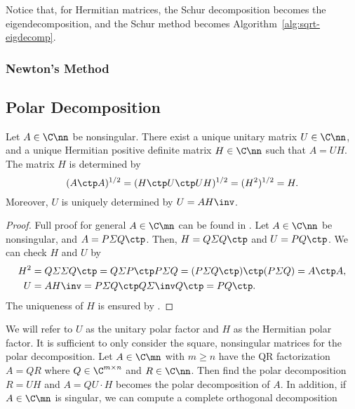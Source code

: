 Notice that, for Hermitian matrices, the Schur decomposition becomes the
eigendecomposition, and the Schur method becomes
Algorithm~\ref{alg:sqrt-eigdecomp}.



\subsubsection{Newton's Method}














\subsection{Polar Decomposition}
\label{sec.polar-decomposition}

\begin{theorem}
Let $A\in\C\nn$ be nonsingular. There exist a unique unitary matrix
$U\in\C\nn$, and a unique Hermitian positive definite matrix $H\in\C\nn$
such that $A = UH$. The matrix $H$ is determined by
\begin{equation}\notag
  (A\ctp A)^{1/2} = (H\ctp U\ctp U H)^{1/2} = (H^{2})^{1/2} = H. 
\end{equation}
Moreover, $U$ is uniquely determined by $U = AH\inv$.
\end{theorem}

\begin{proof}
Full proof for general $A\in\C\mn$ can be found in . Let $A\in\C\nn$ be nonsingular, and
$A = P\varSigma Q\ctp$. Then, $H = Q\varSigma Q\ctp$ and $U = PQ\ctp$. We
can check $H$ and $U$ by
\begin{align*}
  H^{2} & = Q\varSigma\varSigma Q\ctp = Q\varSigma P\ctp P\varSigma Q =
          (P\varSigma Q\ctp)\ctp (P\varSigma Q) = A\ctp A, \\
  U & = AH\inv = P\varSigma Q\ctp Q\varSigma\inv Q\ctp = PQ\ctp.
\end{align*}
The uniqueness of $H$ is ensured by .
\end{proof}

We will refer to $U$ as the unitary polar factor and $H$ as the Hermitian
polar factor. It is sufficient to only consider the square, nonsingular
matrices for the polar decomposition. Let $A\in\C\mn$ with $m\geq n$ have
the QR factorization $A = QR$ where $Q\in\C^{m\times n}$ and $R\in\C\nn$.
Then find the polar decomposition $R = UH$ and $A = QU\cdot H$ becomes the
polar decomposition of $A$. In addition, if $A\in\C\mn$ is singular, we can
compute a complete orthogonal decomposition

